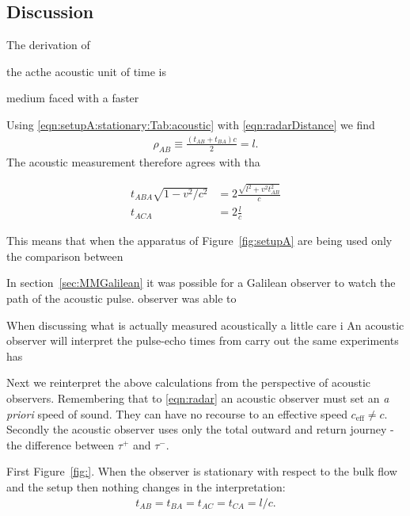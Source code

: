 \documentclass[10pt, fleqn,draft,showtrims,oldfontcommands]{article} %
\newcommand{\secref}[1]{section~\ref{sec:#1}}
\newcommand{\eqnref}[1]{\ref{eqn:#1}}
\newcommand{\figref}[1]{Figure~\ref{fig:#1}}
\newcommand{\lr}[1]{\left( #1 \right)}
\newcommand{\tm}{\tau^-}
\newcommand{\tp}{\tau^+}
\newcommand{\half}{\tfrac{1}{2}}
\newcommand{\eff}{{\textrm{eff}}}
\begin{document}
\subsection{Discussion}
The derivation of 



the acthe acoustic unit of time is 


medium faced with a faster 

Using \eqnref{setupA:stationary:Tab:acoustic} with \ref{eqn:radarDistance} we find
\begin{align}
  \rho_{AB} \equiv \frac{\lr{t_{AB}+t_{BA}}c}{2}  = l.
\end{align}
The acoustic measurement  therefore agrees with tha




\begin{align}
   t_{ABA}   \sqrt{1-v^2/c^2} &=2 \frac{\sqrt{l^2+v^2t_{AB}^2}}{c} \\
  t_{ACA} &= 2\frac{l}{c}
\end{align}

This means that when the apparatus of \figref{setupA} are being used only the comparison between 

In \secref{MMGalilean} it was possible for a Galilean observer to watch the path of the acoustic pulse. observer was able to 

When discussing what is actually measured acoustically a little care i
An acoustic observer will interpret the pulse-echo times from carry out the same experiments has 

Next we reinterpret  the above calculations from the perspective of acoustic observers.
Remembering that to \eqnref{radar} an acoustic observer must set an {\em a priori} speed of sound.
They can have no recourse to an effective speed $c_\eff \ne c$.
Secondly the acoustic observer uses only the total outward and return journey - the difference between $\tp$ and $\tm$.

First \figref{}.
When the observer is stationary with respect to the bulk flow and the setup then nothing changes in the interpretation:
\begin{align}
t_{AB}=t_{BA}=t_{AC}=t_{CA}=l/c.
\end{align}
\end{document}
